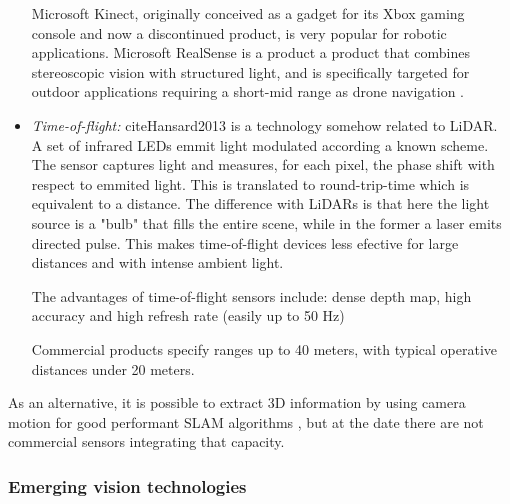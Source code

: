 \begin{itemize}
    Microsoft Kinect, originally conceived as a gadget for its Xbox gaming 
    console and now a discontinued product, is very popular for robotic 
    applications. Microsoft RealSense is a product a product that combines 
    stereoscopic vision with structured light, and is specifically targeted for 
    outdoor applications requiring a short-mid range as drone navigation 
    \cite{}.
    
    \item \emph{Time-of-flight:} cite{Hansard2013} is a technology somehow 
    related to LiDAR. 
    A set of infrared LEDs emmit light modulated according a known scheme.
    The sensor captures light and measures, for each pixel, the phase shift
    with respect to emmited light. This is translated to round-trip-time 
    which is equivalent to a distance.
    The difference with LiDARs is that here the light source is a "bulb" that 
    fills the entire scene, while in the former a laser emits directed pulse.
    This makes time-of-flight devices less efective for large distances and
    with intense ambient light.
    
    The advantages of time-of-flight sensors include: dense depth map, high 
    accuracy and high refresh rate (easily up to 50 Hz) 
    
    Commercial products specify ranges up to 40 meters, with typical operative
    distances under 20 meters.
\end{itemize}

As an alternative, it is possible to extract 3D information by using camera 
motion for good performant SLAM algorithms \cite{Engel2014}\cite{Engel2018}, 
but at the date there are not commercial sensors integrating that capacity.

\subsubsection{Emerging vision technologies}

